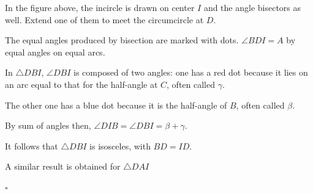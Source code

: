 \documentclass[11pt, oneside]{article}
\begin{document}
In the figure above, the incircle is drawn on center $I$ and the angle bisectors as well.  Extend one of them to meet the circumcircle at $D$.

The equal angles produced by bisection are marked with dots.  $\angle BDI = A$ by equal angles on equal arcs.

In $\triangle DBI$, $\angle DBI$ is composed of two angles:  one has a red dot because it lies on an arc equal to that for the half-angle at $C$, often called $\gamma$.

The other one has a blue dot because it is the half-angle of $B$, often called $\beta$.

By sum of angles then, $\angle DIB = \angle DBI = \beta + \gamma$.

It follows that $\triangle DBI$ is isosceles, with $BD = ID$.

A similar result is obtained for $\triangle DAI$

$\square$
\end{document}
